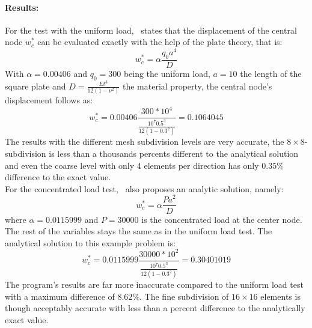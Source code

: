   \paragraph{Results:} For the test with the uniform load,~\cite{jin1994analysis} states that the displacement of the central node $w_c^*$ can be evaluated exactly with the help of the plate theory, that is:
  \begin{equation}\label{eq:test-WC*q}
  w_c^* = \alpha \frac{q_0 a^4}{D}
  \end{equation}
  With $\alpha = 0.00406$ and $q_0 = 300$ being the uniform load, $a = 10$ the length of the square plate and $D = \frac{E t^3}{12 (1-\nu^2)}$ the material property, the central node's displacement follows as:
  \begin{equation*}
  w_c^* = 0.00406 \frac{300 * 10^4}{\frac{10^7 0.5^3}{12(1-0.3^2)}} = 0.1064045
  \end{equation*}
  The results with the different mesh subdivision levels are very accurate, the $8\!\times\!8$-subdivision is less than a thousands percents different to the analytical solution and even the coarse level with only 4 elements per direction has only $0.35\%$ difference to the exact value.\\
  For the concentrated load test,~\cite{jin1994analysis} also proposes an analytic solution, namely:
  \begin{equation}\label{eq:test-WC*P}
  w_c^* = \alpha \frac{P a^2}{D}
  \end{equation}
  where $\alpha = 0.0115999$ and $P = 30000$ is the concentrated load at the center node. The rest of the variables stays the same as in the uniform load test. The analytical solution to this example problem is:
  \begin{equation*}
  w_c^* = 0.0115999 \frac{30000 * 10^2}{\frac{10^7 0.5^3}{12(1-0.3^2)}} = 0.30401019
  \end{equation*}
  The program's results are far more inaccurate compared to the uniform load test with a maximum difference of $8.62\%$. The fine subdivision of $16\!\times\!16$ elements is though acceptably accurate with less than a percent difference to the analytically exact value.
